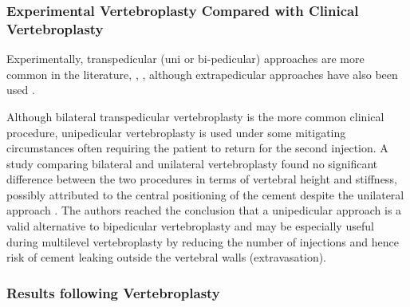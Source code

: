 \subsubsection{Experimental Vertebroplasty Compared with Clinical
Vertebroplasty
}\label{experimental-vertebroplasty-compared-with-clinical-vertebroplasty}

Experimentally, transpedicular (uni or bi-pedicular) approaches are more
common in the literature\cite{furtado2007biomechanical},
\cite{ananthakrishnan2005effect}, \cite{pneumaticos2013effect},
although
extrapedicular approaches have also been used \cite{furtado2007biomechanical}.

Although bilateral transpedicular vertebroplasty is the more common clinical
procedure\cite{tohmeh1999biomechanical}, unipedicular vertebroplasty is used
under some
mitigating circumstances often requiring the patient to return for the
second injection. A study comparing bilateral and unilateral
vertebroplasty found no significant difference between the two
procedures in terms of vertebral height and stiffness, possibly
attributed to the central positioning of the cement despite the
unilateral approach \cite{tohmeh1999biomechanical}. The authors reached the
conclusion that a
unipedicular approach is a valid alternative to bipedicular
vertebroplasty and may be especially useful during multilevel
vertebroplasty by reducing the number of injections and hence risk of
cement leaking outside the vertebral walls (extravasation).

\subsubsection{Results following Vertebroplasty
}\label{results-following-vertebroplasty}

